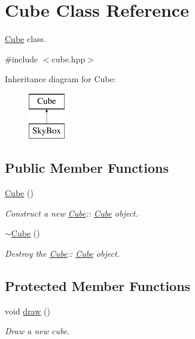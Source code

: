 \hypertarget{classCube}{}\section{Cube Class Reference}
\label{classCube}


\mbox{\hyperlink{classCube}{Cube}} class.  




{\ttfamily \#include $<$cube.\+hpp$>$}

Inheritance diagram for Cube\+:\begin{figure}[H]
\begin{center}
\leavevmode
\includegraphics[height=2.000000cm]{classCube}
\end{center}
\end{figure}
\subsection*{Public Member Functions}
\begin{DoxyCompactItemize}
\item 
\mbox{\hyperlink{classCube_a06f3d86fb63e3aad08623610aa3c17b4}{Cube}} ()
\begin{DoxyCompactList}\small\item\em Construct a new \mbox{\hyperlink{classCube}{Cube}}\+:\+: \mbox{\hyperlink{classCube}{Cube}} object. \end{DoxyCompactList}\item 
\mbox{\hyperlink{classCube_aa814e979cecb8c451fdb332ded2cea1e}{$\sim$\+Cube}} ()
\begin{DoxyCompactList}\small\item\em Destroy the \mbox{\hyperlink{classCube}{Cube}}\+:\+: \mbox{\hyperlink{classCube}{Cube}} object. \end{DoxyCompactList}\end{DoxyCompactItemize}
\subsection*{Protected Member Functions}
\begin{DoxyCompactItemize}
\item 
void \mbox{\hyperlink{classCube_ab26b72a81376fd5dc4fcc7f0b715b087}{draw}} ()
\begin{DoxyCompactList}\small\item\em Draw a new cube. \end{DoxyCompactList}\end{DoxyCompactItemize}

